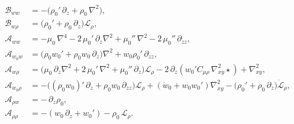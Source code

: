 \begin{subequations}
\label{eq:A_B_operators}
\begin{align}
  \mathscr{B}_{ww}
  &=
  -\Big(\rho_0'\,\partial_z+\rho_0\,\nabla^2\Big), \\
  \mathscr{B}_{w\rho}
  &=
  \Big(\rho_0'+\rho_0\,\partial_z\Big)\mathscr{L}_{\rho}, \\
  \mathscr{A}_{ww}
  &=
  -\mu_0\,\nabla^4
  -2\,\mu_0'\,\partial_z\nabla^2
  +\mu_0''\,\nabla^2
  -2\,\mu_0''\,\partial_{zz}, \\
  \mathscr{A}_{w_0 w}
  &=
  \Big(\rho_0 w_0'+\rho_0 w_0\,\partial_z\Big)\nabla^2
  +w_0\rho_0'\,\partial_{zz}, \\
  \mathscr{A}_{w\rho}
  &=
  \Big(\mu_0\,\partial_z\nabla^2+2\,\mu_0'\,\nabla^2+\mu_0''\,\partial_z\Big)
  \mathscr{L}_{\rho}
  -2\,\partial_z\!\left(w_0'C_{\mu\rho}\,\nabla_{xy}^2\star\right)
  +\nabla_{xy}^2, \\
  \mathscr{A}_{w_0\rho}
  &=
  -\Big((\rho_0 w_0)'\,\partial_z+\rho_0 w_0\,\partial_{zz}\Big)
  \mathscr{L}_{\rho}
  +\left(\dot{w}_0+w_0 w_0'\right)\nabla_{xy}^2
  -\Big(\rho_0'+\rho_0\,\partial_z\Big)\dot{\mathscr{L}}_{\rho}, \\
  \mathscr{A}_{\rho w}
  &=
  -\,\partial_z\rho_0, \\
  \mathscr{A}_{\rho\rho}
  &=
  -\left(w_0\,\partial_z+w_0'\right)-\rho_0\,\mathscr{L}_{\rho}.
\end{align}
\end{subequations}
